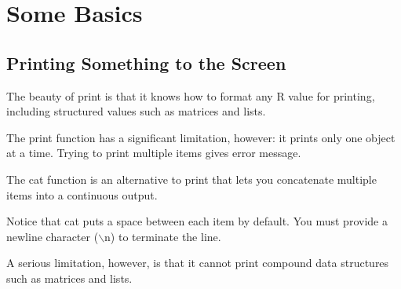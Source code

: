 \chapter{Some Basics\label{Ch02}}
\section{Printing Something to the Screen}
The beauty of print is that it knows how to format any R value for printing, including structured values such as matrices and lists.

The print function has a significant limitation, however: it prints only one object at a time. Trying to print multiple items gives error message.

The cat function is an alternative to print that lets you concatenate multiple items into a continuous output.

Notice that cat puts a space between each item by default. You must provide a newline character ($\backslash$n) to terminate the line.

A serious limitation, however, is that it cannot print compound data structures such as matrices and lists.